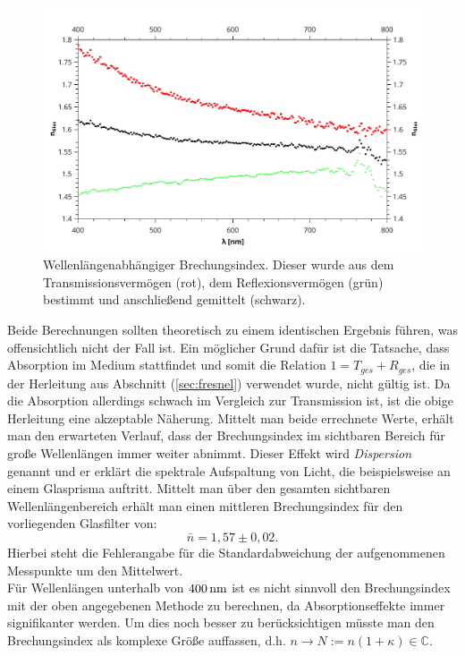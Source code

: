 	\begin{figure} [ht]
				\centering
				\includegraphics[width=\linewidth]{pic/n_glas.pdf}
				\caption{Wellenlängenabhängiger Brechungsindex. Dieser wurde aus dem Transmissionsvermögen (rot), dem Reflexionsvermögen (grün) bestimmt und anschließend gemittelt (schwarz).}
				\label{fig:n_glas}
	\end{figure} 
	Beide Berechnungen sollten theoretisch zu einem identischen Ergebnis führen, was offensichtlich nicht der Fall ist. Ein möglicher Grund dafür ist die Tatsache, dass Absorption im Medium stattfindet und somit die Relation $1 = T_{ges} + R_{ges}$, die in der Herleitung aus Abschnitt (\ref{sec:fresnel}) verwendet wurde, nicht gültig ist. Da die Absorption allerdings schwach im Vergleich zur Transmission ist, ist die obige Herleitung eine akzeptable Näherung. Mittelt man beide errechnete Werte, erhält man den erwarteten Verlauf, dass der Brechungsindex im sichtbaren Bereich für große Wellenlängen immer weiter abnimmt. Dieser Effekt wird \textit{Dispersion} genannt und er erklärt die spektrale Aufspaltung von Licht, die beispielsweise an einem Glasprisma auftritt. Mittelt man über den gesamten sichtbaren Wellenlängenbereich erhält man einen mittleren Brechungsindex für den vorliegenden Glasfilter von:
	\begin{equation}
		\bar{n} = 1,57 \pm 0,02.
	\end{equation}
	Hierbei steht die Fehlerangabe für die Standardabweichung der aufgenommenen Messpunkte um den Mittelwert.\\
	Für Wellenlängen unterhalb  von $\unit[400]{nm}$ ist es nicht sinnvoll den Brechungsindex mit der oben angegebenen Methode zu berechnen, da Absorptionseffekte immer signifikanter werden. Um dies noch besser zu berücksichtigen müsste man den Brechungsindex als komplexe Größe auffassen, d.h. $n \rightarrow N := n(1 + \kappa) \in \mathbb{C}$.
	

